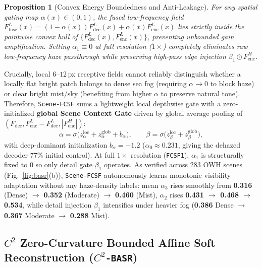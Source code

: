 \documentclass[journal,twoside]{IEEEtran}
\newtheorem{proposition}{Proposition}
\begin{document}
\begin{proposition}[Convex Energy Boundedness and Anti-Leakage]
\label{prop:fcsf}
For any spatial gating map $\alpha(x)\in(0,1)$, the fused low-frequency field $F_{\mathrm{fuse}}^L(x) = (1-\alpha(x))F_{\mathrm{dec}}^L(x) + \alpha(x)F_{\mathrm{enc}}^L(x)$ lies strictly inside the pointwise convex hull of $\{F_{\mathrm{dec}}^L(x), F_{\mathrm{enc}}^L(x)\}$, preventing unbounded gain amplification. Setting $\alpha_1\equiv 0$ at full resolution ($1\times$) completely eliminates raw low-frequency haze passthrough while preserving high-pass edge injection $\beta_1 \odot F_{\mathrm{enc}}^H$.
\end{proposition}

Crucially, local $6\text{--}12$\,px receptive fields cannot reliably distinguish whether a locally flat bright patch belongs to dense sea fog (requiring $\alpha\to 0$ to block haze) or clear bright mist/sky (benefiting from higher $\alpha$ to preserve natural tone). Therefore, \texttt{Scene-FCSF} sums a lightweight local depthwise gate with a zero-initialized \textbf{global Scene Context Gate} driven by global average pooling of $(F_{\mathrm{dec}}, F_{\mathrm{enc}}^L - F_{\mathrm{dec}}^L, |F_{\mathrm{enc}}^H|)$:
\begin{equation}
\alpha = \sigma\big(z_{\alpha}^{\mathrm{loc}} + z_{\alpha}^{\mathrm{glob}} + b_{\alpha}\big), \qquad \beta = \sigma\big(z_{\beta}^{\mathrm{loc}} + z_{\beta}^{\mathrm{glob}}\big),
\label{eq:fcsf_gate}
\end{equation}
with deep-dominant initialization $b_{\alpha}=-1.2$ ($\alpha_0\approx 0.231$, giving the dehazed decoder $77\%$ initial control). At full $1\times$ resolution (\texttt{FCSF1}), $\alpha_1$ is structurally fixed to $0$ so only detail gate $\beta_1$ operates. As verified across 283 OWH scenes (Fig.~\ref{fig:basr}(b)), \texttt{Scene-FCSF} autonomously learns monotonic visibility adaptation without any haze-density labels: mean $\alpha_3$ rises smoothly from \textbf{0.316} (Dense) $\to$ \textbf{0.352} (Moderate) $\to$ \textbf{0.460} (Mist), $\alpha_2$ rises \textbf{0.431 $\to$ 0.468 $\to$ 0.534}, while detail injection $\beta_1$ intensifies under heavier fog (\textbf{0.386} Dense $\to$ \textbf{0.367} Moderate $\to$ \textbf{0.288} Mist).

\subsection{\texorpdfstring{$C^2$}{C2} Zero-Curvature Bounded Affine Soft Reconstruction (\texorpdfstring{\texttt{$C^2$-BASR}}{C2-BASR})}
\label{sec:basr}
\end{document}
